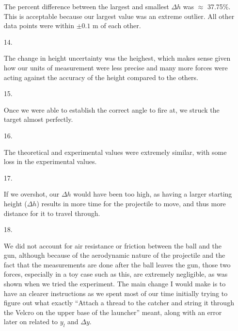 \begin{enumerate}
        The percent difference between the largest and smallest $\Delta h$ was $\approx$ 37.75\%. This is acceptable because our largest value was an extreme outlier. All other data points were within $\pm 0.1$ m of each other.

        \item [14.]
        
        The change in height uncertainty was the heighest, which makes sense given how our units of measurement were less precise and many more forces were acting against the accuracy of the height compared to the others.

        \item [15.]
        
        Once we were able to establish the correct angle to fire at, we struck the target almost perfectly.

        \item [16.]
        
        The theoretical and experimental values were extremely similar, with some loss in the experimental values.

        \item [17.]
        
        If we overshot, our $\Delta h$ would have been too high, as having a larger starting height ($\Delta h$) results in more time for the projectile to move, and thus more distance for it to travel through.

        \item [18.]
        
        We did not account for air resistance or friction between the ball and the gun, although because of the aerodynamic nature of the projectile and the fact that the measurements are done after the ball leaves the gun, those two forces, especially in a toy case such as this, are extremely negligible, as was shown when we tried the experiment. The main change I would make is to have an clearer instructions as we spent most of our time initially trying to figure out what exactly ``Attach a thread to the catcher and string it through the Velcro on the upper base of the launcher'' meant, along with an error later on related to $y_{l}$ and $\Delta y$.

    \end{enumerate}

